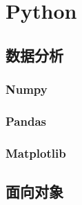 \chapter{Python}
\section{数据分析}
\subsection{Numpy}
\subsection{Pandas}
\subsection{Matplotlib}
\section{面向对象}